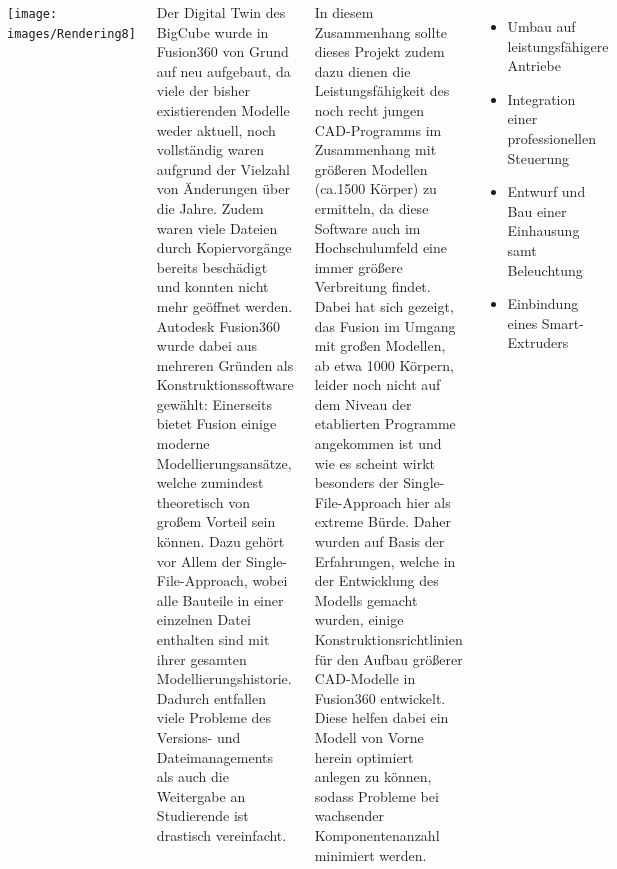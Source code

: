 \documentclass[25pt,a0paper, portrait]{tikzposter}
\begin{document}
\begin{columns} 
	
	{
		{
			\begin{tikzfigure}
				\texttt{[image: images/Rendering8]}
			\end{tikzfigure}	
		}
	}
	
	
	{
		{
			Der Digital Twin des BigCube wurde in Fusion360 von Grund auf neu aufgebaut, da viele der bisher existierenden Modelle weder aktuell, noch vollständig waren aufgrund der Vielzahl von Änderungen über die Jahre. Zudem waren viele Dateien durch Kopiervorgänge bereits beschädigt und konnten nicht mehr geöffnet werden. Autodesk Fusion360 wurde dabei aus mehreren Gründen als Konstruktionssoftware gewählt: Einerseits bietet Fusion einige moderne Modellierungsansätze, welche zumindest theoretisch von großem Vorteil sein können. Dazu gehört vor Allem der Single-File-Approach, wobei alle Bauteile in einer einzelnen Datei enthalten sind mit ihrer gesamten Modellierungshistorie. Dadurch entfallen viele Probleme des Versions- und Dateimanagements als auch die Weitergabe an Studierende ist drastisch vereinfacht.
			
			In diesem Zusammenhang sollte dieses Projekt zudem dazu dienen die Leistungsfähigkeit des noch recht jungen CAD-Programms im Zusammenhang mit größeren Modellen (ca.1500 Körper) zu ermitteln, da diese Software auch im Hochschulumfeld eine immer größere Verbreitung findet.
			Dabei hat sich gezeigt, das Fusion im Umgang mit großen Modellen, ab etwa 1000 Körpern, leider noch nicht auf dem Niveau der etablierten Programme angekommen ist und wie es scheint wirkt besonders der Single-File-Approach hier als extreme Bürde.
			Daher wurden auf Basis der Erfahrungen, welche in der Entwicklung des Modells gemacht wurden, einige Konstruktionsrichtlinien für den Aufbau größerer CAD-Modelle in Fusion360 entwickelt. Diese helfen dabei ein Modell von Vorne herein optimiert anlegen zu können, sodass Probleme bei wachsender Komponentenanzahl minimiert werden.
		}
		{
			\begin{itemize}
				\item Umbau auf leistungsfähigere Antriebe
				\item Integration einer professionellen Steuerung
				\item Entwurf und Bau einer Einhausung samt Beleuchtung
				\item Einbindung eines Smart-Extruders
			\end{itemize}
		}
	}
\end{columns}
\end{document}
